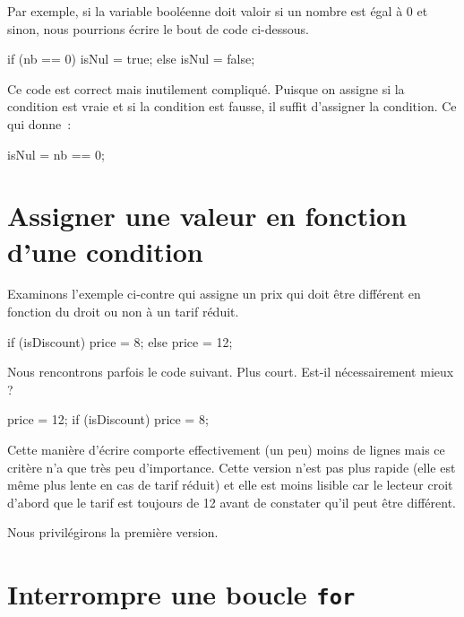 	Par exemple, si la variable booléenne  doit valoir  si un
	nombre est égal à 0 et  sinon, nous pourrions écrire le bout de
	code ci-dessous.	

	\begin{java}
if (nb == 0){
	isNul = true;
} else {
	isNul = false;
}
	\end{java}

	Ce code est correct mais inutilement compliqué.  Puisque on assigne
	 si la condition est vraie et  si la condition est
	fausse, il suffit d’assigner la condition.  Ce qui donne~:

	\begin{java}
isNul = nb == 0;
	\end{java}



\section{Assigner une valeur en fonction d’une condition}\label{B-ass-val}

	Examinons l’exemple ci-contre qui assigne un prix  qui doit être
	différent en fonction du droit ou non à un tarif réduit.  

	\begin{java}
if (isDiscount){
	price = 8;
} else {
	price = 12;
}
	\end{java}
	
	Nous rencontrons parfois le code suivant. Plus court. Est-il nécessairement
	mieux ? 

	\begin{java}
price = 12;
if (isDiscount){
	price = 8;
}
	\end{java}

	Cette manière d'écrire comporte effectivement (un peu) moins de lignes mais
	ce critère n’a que très peu d’importance.  Cette version n’est pas plus
	rapide (elle est même plus lente en cas de tarif réduit) et elle est moins
	lisible car le lecteur croit d’abord que le tarif est toujours de 12 avant
	de constater qu’il peut être différent.

	Nous privilégirons la première version. 
	
	\section{Interrompre une boucle \texttt{for}}
	\label{B-for-break}

